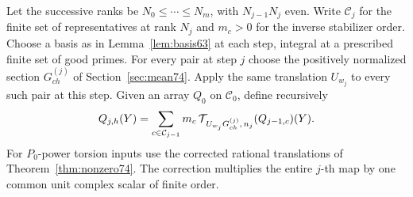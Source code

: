 \documentclass[a4paper,11pt]{article}
\theoremstyle{definition}
\theoremstyle{remark}
\numberwithin{equation}{section}
\begin{document}
Let the successive ranks be \(N_0\le\cdots\le N_m\), with
\(N_{j-1}N_j\) even. Write \(\mathcal C_j\) for the finite set
of representatives at rank \(N_j\) and \(m_c>0\) for the inverse
stabilizer order. Choose a basis as in Lemma~\ref{lem:basis63} at
each step, integral at a prescribed finite set of good primes.
For every pair at step \(j\) choose the positively normalized
section \(G^{(j)}_{ch}\) of Section~\ref{sec:mean74}. Apply the
same translation \(U_{w_j}\) to every such pair at this step.
Given an array \(Q_0\) on \(\mathcal C_0\), define recursively
\begin{equation}
  Q_{j,h}(Y)=\sum_{c\in\mathcal C_{j-1}}m_c\,
       {\cal T}_{\,U_{w_j}G^{(j)}_{ch},\,n_j}(Q_{j-1,c})(Y).
                                                        \label{eq:array81}
\end{equation}
For \(P_0\)-power torsion inputs use the corrected rational
translations of Theorem~\ref{thm:nonzero74}. The correction multiplies
the entire \(j\)-th map by one common unit complex scalar of finite order.
\end{document}
